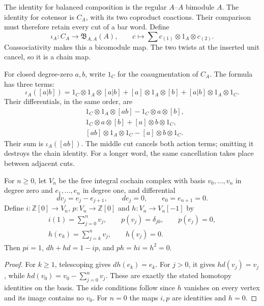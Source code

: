 The identity for balanced composition is the regular \(A\)--\(A\) bimodule \(A\).
The identity for cotensor is \(C_A\), with its two coproduct coactions.
Their comparison must therefore retain every cut of a bar word.
Define
\begin{equation}\label{ogd:eq:diagonal-bimodule}
 \iota_A:C_A\longrightarrow\mathfrak B_{A,A}(A),\qquad
 c\longmapsto\sum c_{(1)}\otimes1_A\otimes c_{(2)}.
\end{equation}
Coassociativity makes this a bicomodule map.
The two twists at the inserted unit cancel, so it is a chain map.

For closed degree-zero \(a,b\), write \(1_C\) for the coaugmentation of \(C_A\).
The formula has three terms:
\[
 \iota_A([a|b])=
 1_C\otimes1_A\otimes[a|b]
 +[a]\otimes1_A\otimes[b]
 +[a|b]\otimes1_A\otimes1_C.
\]
Their differentials, in the same order, are
\begin{align*}
 &1_C\otimes1_A\otimes[ab]-1_C\otimes a\otimes[b],\\
 &1_C\otimes a\otimes[b]+[a]\otimes b\otimes1_C,\\
 &[ab]\otimes1_A\otimes1_C-[a]\otimes b\otimes1_C.
\end{align*}
Their sum is \(\iota_A([ab])\).
The middle cut cancels both action terms; omitting it destroys the chain identity.
For a longer word, the same cancellation takes place between adjacent cuts.

\begin{lemma}\label{ogd:lem:interval-contraction}
For \(n\geq0\), let \(V_n\) be the free integral cochain complex with basis \(v_0,\ldots,v_n\) in degree zero and \(e_1,\ldots,e_n\) in degree one, and differential
\[
 dv_j=e_j-e_{j+1},\qquad de_j=0,\qquad e_0=e_{n+1}=0.
\]
Define \(i:\mathbb Z[0]\to V_n\), \(p:V_n\to\mathbb Z[0]\) and \(h:V_n\to V_n[-1]\) by
\begin{gather*}
 i(1)=\sum_{j=0}^nv_j,\qquad p(v_j)=\delta_{j0},\qquad p(e_j)=0,\\
 h(e_k)=\sum_{j=k}^nv_j,\qquad h(v_j)=0.
\end{gather*}
Then \(pi=1\), \(dh+hd=1-ip\), and \(ph=hi=h^2=0\).
\end{lemma}
\begin{proof}
For \(k\geq1\), telescoping gives \(dh(e_k)=e_k\).
For \(j>0\), it gives \(hd(v_j)=v_j\), while \(hd(v_0)=v_0-\sum_{j=0}^nv_j\).
These are exactly the stated homotopy identities on the basis.
The side conditions follow since \(h\) vanishes on every vertex and its image contains no \(v_0\).
For \(n=0\) the maps \(i,p\) are identities and \(h=0\).
\end{proof}

